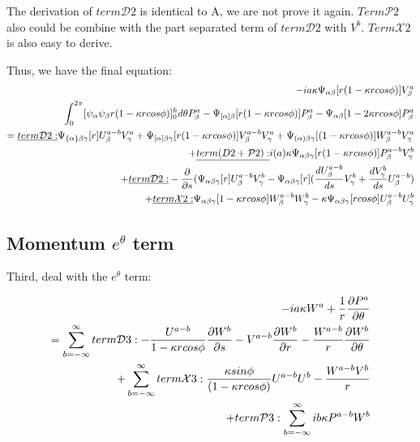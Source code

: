 \documentclass{Note}
\begin{document}
The derivation of $term\mathcal{D}2$ is identical to A, we are not prove it again. $Term\mathcal{P}2$ also could be combine with the part separated term of  $term\mathcal{D}2$ with $V^b$.  $Term\mathcal{X}2$ is also easy to derive.


Thus, we have the final equation:
\begin{equation}
\begin{aligned}
-ia\kappa \Psi_{\alpha\beta}[r(1-\kappa rcos\phi)]V_\beta^a\\
\int_0^{2\pi}  [{\psi_\alpha \psi_\beta   r(1-\kappa r cos\phi)}]_0^h d\theta P_\beta^a
-\Psi_{[\alpha]\beta}[r(1-\kappa r cos\phi)]P_\beta^a-\Psi_{\alpha\beta}[1-2\kappa r cos\phi]P_\beta^a\\
=
\underline{term \mathcal{D}2:}  \Psi_{\{\alpha\}\beta\gamma} [r]U_\beta^{a-b}V_\gamma^a
+\Psi_{[\alpha]\beta\gamma} [r(1-\kappa rcos\phi)]V_\beta^{a-b}V_\gamma^a
+ \Psi_{(\alpha)\beta\gamma} [(1-\kappa rcos\phi)]W_\beta^{a-b}V_\gamma^a\\
+\underline{term\mathcal({D}2+\mathcal{P}2):}  i(a)\kappa \Psi_{\alpha\beta\gamma}[r(1-\kappa r cos\phi)]P_\beta^{a-b}V_\gamma^{b}\\
+\underline{term \mathcal{D}2:} -{{\partial }\over {\partial s}}(\Psi_{\alpha\beta\gamma}[r]U_\beta^{a-b}V_\gamma^{b}
-\Psi_{\alpha\beta\gamma}[r]({{d U_\beta^{a-b} \over {d s}}V_\gamma^{b}}+{dV_\gamma^{b}\over ds}U_\beta^{a-b})\\
+\underline{term \mathcal{X}2:} \Psi_{\alpha\beta\gamma}[1-\kappa rcos\phi]W_\beta^{a-b}W_\gamma^b-\kappa \Psi_{\alpha\beta\gamma}[r cos\phi]U_\beta^{a-b}U_\gamma^b\\
\end{aligned}
\end{equation}



\subsection{Momentum $e^\theta$ term}

Third, deal with the $e^\theta$ term:

\begin{equation}
\begin{aligned}
-ia\kappa W^a+{1\over r}{\partial P^a\over {\partial \theta}}\\
=
\sum_{b=-\infty}^{\infty}
term\mathcal{D}3: -{U^{a-b}\over {1-\kappa r cos\phi}}  {{\partial W^b} \over {\partial s}}-V^{a-b}{{\partial W^b}\over{\partial r}}-{W^{a-b}\over r}{{\partial W^b}\over {\partial \theta}}\\
+ \sum_{b=-\infty}^{\infty}
term\mathcal{X}3: {\kappa sin\phi \over{(1-\kappa r cos\phi)}}U^{a-b}U^b-{W^{a-b}V^b\over{r}}\\
+term\mathcal{P}3:  \sum_{b=-\infty}^{\infty}
ib\kappa P^{a-b}W^{b}
\end{aligned}
\end{equation}
\end{document}
